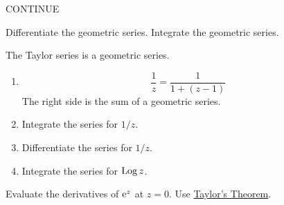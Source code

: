 {%
\begin{Hint}
  \label{hint convergence n/2^n (z-i)^n}
\end{Hint}



\begin{Hint}
  \label{hint circle of convergence k zk}
  CONTINUE
\end{Hint}



\begin{Hint}
  \label{hint sum (n+1)z^n}
  Differentiate the geometric series.  Integrate the geometric series.
\end{Hint}



\begin{Hint}
  \label{hint taylor 1/(1+z^2)}
  The Taylor series is a geometric series.
\end{Hint}


\begin{Hint}
  \label{hint taylor log(1+z)}
\end{Hint}


\begin{Hint}
  \label{hint taylor (1+z)^a}
\end{Hint}


\begin{Hint}
  \label{hint taylor series 1/z}
  \begin{enumerate}
  \item
    \[
    \frac{1}{z} = \frac{1}{1 + (z - 1)}
    \]
    The right side is the sum of a geometric series.
  \item
    Integrate the series for $1/z$.
  \item
    Differentiate the series for $1/z$.
  \item
    Integrate the series for $\mathop{\mathrm{Log}}\nolimits z$.
  \end{enumerate}
\end{Hint}


\begin{Hint}
  \label{hint taylor exp cos sin}
  Evaluate the derivatives of $\mathop{\mathrm{e}}\nolimits^z$ at $z = 0$.  Use 
  \hyperref[result taylor theorem]{Taylor's Theorem}.


\end{Hint}}
